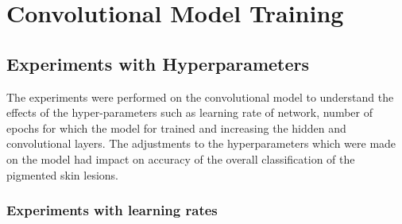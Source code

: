 \section{Convolutional Model Training}

\pagebreak
\subsection{Experiments with Hyperparameters}
The experiments were performed on the convolutional model to understand the effects of the hyper-parameters 
such as learning rate of network, number of epochs for which the model for trained and increasing the hidden  
and convolutional layers. The adjustments to the hyperparameters which were made on the model had impact on 
accuracy of the overall classification of the pigmented skin lesions.
\subsubsection{Experiments with learning rates}

